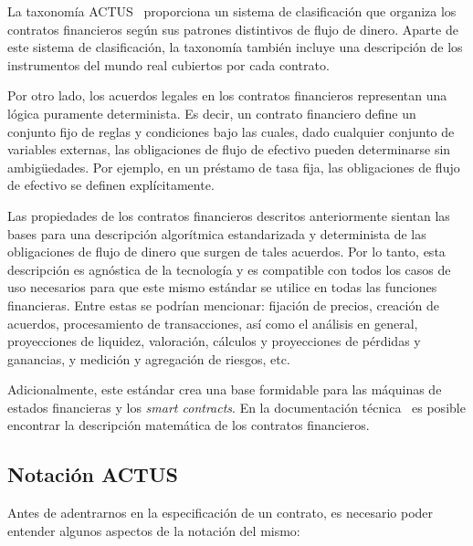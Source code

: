 \documentclass[12pt]{book}
\begin{document}
La taxonomía ACTUS~\cite{ACTUS_Taxonomy}  proporciona un sistema de clasificación que organiza los contratos financieros según sus patrones distintivos de flujo de dinero. Aparte de este sistema de clasificación, la taxonomía también incluye una descripción de los instrumentos del mundo real cubiertos por cada contrato.

Por otro lado, los acuerdos legales en los contratos financieros representan una lógica puramente determinista. Es decir, un contrato financiero define un conjunto fijo de reglas y condiciones bajo las cuales, dado cualquier conjunto de variables externas, las obligaciones de flujo de efectivo pueden determinarse sin ambigüedades. Por ejemplo, en un préstamo de tasa fija, las obligaciones de flujo de efectivo se definen explícitamente.

Las propiedades de los contratos financieros descritos anteriormente sientan las bases para una descripción algorítmica estandarizada y determinista de las obligaciones de flujo de dinero que surgen de tales acuerdos. Por lo tanto, esta descripción es agnóstica de la tecnología y es compatible con todos los casos de uso necesarios para que este mismo estándar se utilice en todas las funciones financieras. Entre estas se podrían mencionar: fijación de precios, creación de acuerdos, procesamiento de transacciones, así como el análisis en general, proyecciones de liquidez, valoración, cálculos y proyecciones de pérdidas y ganancias, y medición y agregación de riesgos, etc.

Adicionalmente, este estándar crea una base formidable para las máquinas de estados financieras y los \textit{smart contracts}. En la documentación técnica~\cite{ACTUS_Techspecs} es posible encontrar la descripción matemática de los contratos financieros.


\subsection{Notación ACTUS}

Antes de adentrarnos en la especificación de un contrato, es necesario poder entender algunos aspectos de la notación del mismo:
\end{document}
